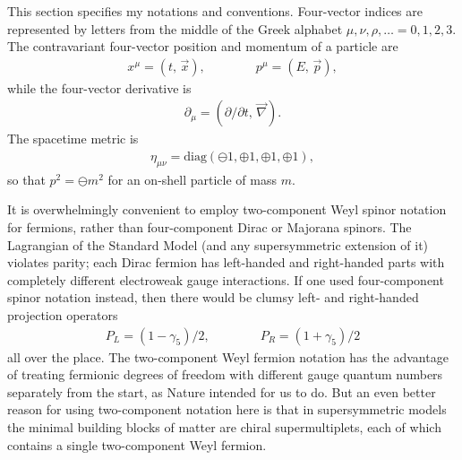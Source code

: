 \documentclass[11pt]{article}
\def\BDpos{}
\def\BDplus{+}
\def\BDminus{-}
\def\BDpos{-}
\def\BDplus{-}
\def\BDminus{+}
\def\BDpos{\oplus}
\def\BDplus{\oplus}
\def\BDminus{\ominus}
\def\BDpos{\ominus}
\def\BDplus{\ominus}
\def\BDminus{\oplus}
\def\beq{\begin{eqnarray}}
\def\eeq{\end{eqnarray}}
\begin{document}
This section specifies my notations and conventions.  Four-vector indices
are represented by letters from the middle of the Greek alphabet
$\mu,\nu,\rho,\dots= 0,1,2,3$. The contravariant four-vector position and
momentum of a particle are
\beq
x^\mu = (t,\, \vec{x}), \qquad\qquad p^\mu = (E,\, \vec{p}) ,
\eeq
while the four-vector derivative is
\beq
\partial_\mu = ({\partial / \partial t},\, \vec{\nabla}) .
\eeq
The spacetime metric is 
\beq
\eta_{\mu\nu} = 
{\mbox{diag}}(\BDplus 1, \BDminus 1, \BDminus 1, \BDminus 1), 
\eeq
so that $p^2 = \BDpos m^2$ for an on-shell particle of mass $m$.

It is overwhelmingly convenient to employ two-component Weyl spinor
notation for fermions, rather than four-component Dirac or Majorana
spinors. The Lagrangian of the Standard Model (and any supersymmetric
extension of it) violates parity; each Dirac fermion has left-handed and
right-handed parts with completely different electroweak gauge
interactions. If one used four-component spinor notation instead, then
there would be clumsy left- and right-handed projection operators
\beq
P_L = (1 - \gamma_5)/2, \qquad\qquad
P_R = (1 + \gamma_5)/2
\eeq
all over the place. The two-component Weyl fermion notation has the
advantage of treating fermionic degrees of freedom with different gauge
quantum numbers separately from the start, as Nature intended for us to
do. But an even better reason for using two-component notation here is
that in supersymmetric models the minimal building blocks of matter are
chiral supermultiplets, each of which contains a single two-component Weyl
fermion. 
\end{document}
